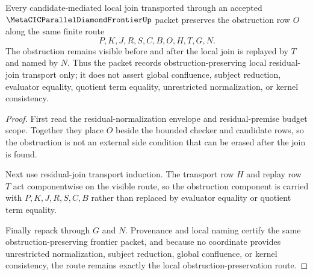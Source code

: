 \begin{theorem}
\label{thm:metacic-parallel-diamond-frontier-obstruction-preservation-route}
Every candidate-mediated local join transported through an accepted $\MetaCICParallelDiamondFrontierUp$ packet preserves the obstruction row $O$ along the same finite route
$$
P,K,J,R,S,C,B,O,H,T,G,N.
$$
The obstruction remains visible before and after the local join is replayed by $T$ and named by $N$. Thus the packet records obstruction-preserving local residual-join transport only; it does not assert global confluence, subject reduction, evaluator equality, quotient term equality, unrestricted normalization, or kernel consistency.
\end{theorem}
\begin{proof}
First read the residual-normalization envelope and residual-premise budget scope. Together they place $O$ beside the bounded checker and candidate rows, so the obstruction is not an external side condition that can be erased after the join is found.

Next use residual-join transport induction. The transport row $H$ and replay row $T$ act componentwise on the visible route, so the obstruction component is carried with $P,K,J,R,S,C,B$ rather than replaced by evaluator equality or quotient term equality.

Finally repack through $G$ and $N$. Provenance and local naming certify the same obstruction-preserving frontier packet, and because no coordinate provides unrestricted normalization, subject reduction, global confluence, or kernel consistency, the route remains exactly the local obstruction-preservation route.
\end{proof}

